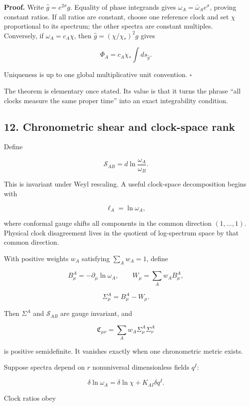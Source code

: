 \documentclass[
]{article}
\begin{document}
\textbf{Proof.} Write \(\widehat g=e^{2\sigma}g\). Equality of phase
integrands gives \(\omega_A=\bar\omega_Ae^\sigma\), proving constant
ratios. If all ratios are constant, choose one reference clock and set
\(\chi\) proportional to its spectrum; the other spectra are constant
multiples. Conversely, if \(\omega_A=c_A\chi\), then
\(\widehat g=(\chi/\chi_*)^2g\) gives

\[
\Phi_A=c_A\chi_*\int ds_{\widehat g}.
\]

Uniqueness is up to one global multiplicative unit convention.
\(\square\)

The theorem is elementary once stated. Its value is that it turns the
phrase ``all clocks measure the same proper time'' into an exact
integrability condition.

\hypertarget{chronometric-shear-and-clock-space-rank}{%
\subsection{12. Chronometric shear and clock-space
rank}\label{chronometric-shear-and-clock-space-rank}}

Define

\[
\boxed{
\mathcal S_{AB}=d\ln\frac{\omega_A}{\omega_B}.
}
\]

This is invariant under Weyl rescaling. A useful clock-space
decomposition begins with

\[
\ell_A=\ln\omega_A,
\]

where conformal gauge shifts all components in the common direction
\((1,\ldots,1)\). Physical clock disagreement lives in the quotient of
log-spectrum space by that common direction.

With positive weights \(w_A\) satisfying \(\sum_Aw_A=1\), define

\[
B^A_\mu=-\partial_\mu\ln\omega_A,
\qquad
W_\mu=\sum_Aw_AB^A_\mu,
\]

\[
\Sigma^A_\mu=B^A_\mu-W_\mu.
\]

Then \(\Sigma^A\) and \(\mathcal S_{AB}\) are gauge invariant, and

\[
\mathfrak C_{\mu\nu}=\sum_Aw_A\Sigma^A_\mu\Sigma^A_\nu
\]

is positive semidefinite. It vanishes exactly when one chronometric
metric exists.

Suppose spectra depend on \(r\) nonuniversal dimensionless fields
\(q^I\):

\[
\delta\ln\omega_A
=\delta\ln\chi+K_{AI}\delta q^I.
\]

Clock ratios obey
\end{document}

